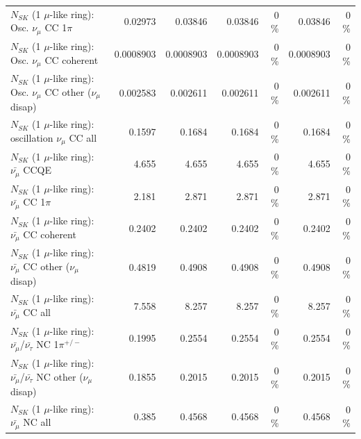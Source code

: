 \begin{table}
\begin{tabular}{| l | r | r | r  r | r  r |}
                          $N_{SK}$ (1 $\mu$-like ring): Osc. $\nu_\mu$ CC 1$\pi$ &         0.02973 &         0.03846 &         0.03846 &        0 \%  &         0.03846 &        0 \%  \\ 
                        $N_{SK}$ (1 $\mu$-like ring): Osc. $\nu_\mu$ CC coherent &       0.0008903 &       0.0008903 &       0.0008903 &        0 \%  &       0.0008903 &        0 \%  \\ 
         $N_{SK}$ (1 $\mu$-like ring): Osc. $\nu_\mu$ CC other ($\nu_\mu$ disap) &        0.002583 &        0.002611 &        0.002611 &        0 \%  &        0.002611 &        0 \%  \\ 
                      $N_{SK}$ (1 $\mu$-like ring): oscillation $\nu_\mu$ CC all &          0.1597 &          0.1684 &          0.1684 &        0 \%  &          0.1684 &        0 \%  \\ 
\hline
\hline
                              $N_{SK}$ (1 $\mu$-like ring): $\bar{\nu_\mu}$ CCQE &           4.655 &           4.655 &           4.655 &        0 \%  &           4.655 &        0 \%  \\ 
                         $N_{SK}$ (1 $\mu$-like ring): $\bar{\nu_\mu}$ CC 1$\pi$ &           2.181 &           2.871 &           2.871 &        0 \%  &           2.871 &        0 \%  \\ 
                       $N_{SK}$ (1 $\mu$-like ring): $\bar{\nu_\mu}$ CC coherent &          0.2402 &          0.2402 &          0.2402 &        0 \%  &          0.2402 &        0 \%  \\ 
        $N_{SK}$ (1 $\mu$-like ring): $\bar{\nu_\mu}$ CC other ($\nu_\mu$ disap) &          0.4819 &          0.4908 &          0.4908 &        0 \%  &          0.4908 &        0 \%  \\ 
                          $N_{SK}$ (1 $\mu$-like ring): $\bar{\nu_{\mu}}$ CC all &           7.558 &           8.257 &           8.257 &        0 \%  &           8.257 &        0 \%  \\ 
\hline
  $N_{SK}$ (1 $\mu$-like ring): $\bar{\nu_\mu}$/$\bar{\nu_\tau}$ NC 1$\pi^{+/-}$ &          0.1995 &          0.2554 &          0.2554 &        0 \%  &          0.2554 &        0 \%  \\ 
$N_{SK}$ (1 $\mu$-like ring): $\bar{\nu_\mu}$/$\bar{\nu_\tau}$ NC other ($\nu_\mu$ disap) &          0.1855 &          0.2015 &          0.2015 &        0 \%  &          0.2015 &        0 \%  \\ 
                          $N_{SK}$ (1 $\mu$-like ring): $\bar{\nu_{\mu}}$ NC all &           0.385 &          0.4568 &          0.4568 &        0 \%  &          0.4568 &        0 \%  \\ 

\end{tabular}
\end{table}
